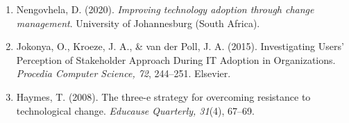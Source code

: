 \documentclass{article}
\begin{document}
\begin{enumerate}
    \item Nengovhela, D. (2020). \textit{Improving technology adoption through change management}. University of Johannesburg (South Africa).

    \item Jokonya, O., Kroeze, J. A., \& van der Poll, J. A. (2015). Investigating Users' Perception of Stakeholder Approach During IT Adoption in Organizations. \textit{Procedia Computer Science, 72}, 244--251. Elsevier.

    \item Haymes, T. (2008). The three-e strategy for overcoming resistance to technological change. \textit{Educause Quarterly, 31}(4), 67--69.
    
\end{enumerate}
\end{document}
